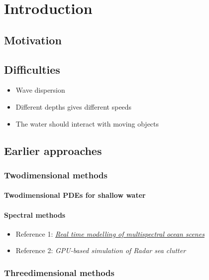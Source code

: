 \part{Introduction}

\chapter{Motivation}

\chapter{Difficulties}

\begin{itemize}
    \item Wave dispersion
    \item Different depths gives different speeds
    \item The water should interact with moving objects
\end{itemize}

\chapter{Earlier approaches}

\section{Twodimensional methods}

\subsection{Twodimensional PDEs for shallow water}

\subsection{Spectral methods}

\begin{itemize}
    \item Reference 1: \textit{\href{http://web1.see.asso.fr/ocoss2010/Session_4/20100531111216_Monnier_OCOSS2010-Paper_MERCUDA_item_2.pdf}{Real time modelling of multispectral ocean scenes}}
    \item Reference 2: \textit{GPU-based simulation of Radar sea clutter}
\end{itemize}

\section{Threedimensional methods}


